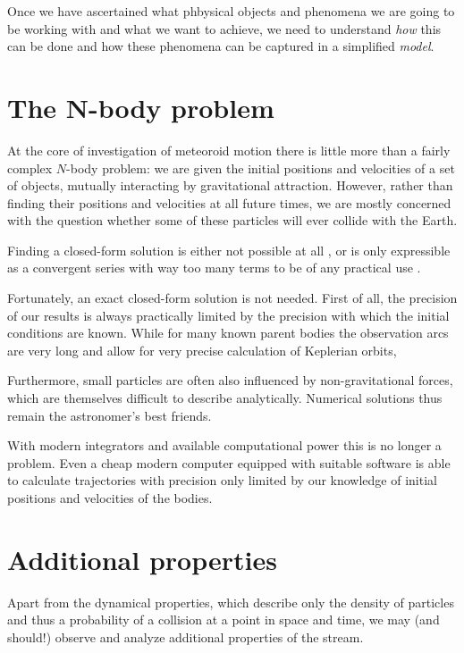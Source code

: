 
Once we have ascertained what phbysical objects and phenomena we are going to be working with and what we want to achieve,
we need to understand \emph{how} this can be done and how these phenomena can be captured in a simplified \emph{model}.


\section{The N-body problem} \label{mN}
    At the core of investigation of meteoroid motion there is little more than a fairly complex $N$-body problem:
    we are given the initial positions and velocities of a set of objects, mutually interacting by gravitational attraction.
    However, rather than finding their positions and velocities at all future times, we are mostly concerned
    with the question whether some of these particles will ever collide with the Earth.

    Finding a closed-form solution is either not possible at all \cite{...}, or is only expressible
    as a convergent series with way too many terms to be of any practical use \citep{beloriszky-1930}.

    Fortunately, an exact closed-form solution is not needed. First of all, the precision of our results
    is always practically limited by the precision with which the initial conditions are known.
    While for many known parent bodies the observation arcs are very long and allow for very precise
    calculation of Keplerian orbits,

    Furthermore, small particles are often also influenced by non-gravitational forces,
    which are themselves difficult to describe analytically.
    Numerical solutions thus remain the astronomer's best friends.

    With modern integrators and available computational power this is no longer a problem.
    Even a cheap modern computer equipped with suitable software is able to calculate trajectories
    with precision only limited by our knowledge of initial positions and velocities of the bodies.

\section{Additional properties} \label{ma}
    Apart from the dynamical properties, which describe only the density of particles
    and thus a probability of a collision at a point in space and time,
    we may (and should!) observe and analyze additional properties of the stream.

